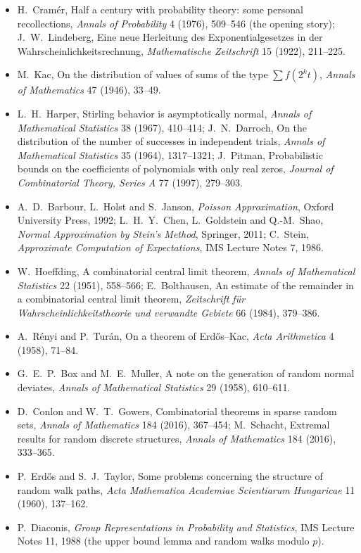 \begin{itemize}
\item H.~Cramér, Half a century with probability theory: some personal recollections, \emph{Annals of Probability} 4 (1976), 509--546 (the opening story);
J.~W.~Lindeberg, Eine neue Herleitung des Exponentialgesetzes in der Wahrscheinlichkeitsrechnung, \emph{Mathematische Zeitschrift} 15 (1922), 211--225.
\item M.~Kac, On the distribution of values of sums of the type $\sum f(2^kt)$, \emph{Annals of Mathematics} 47 (1946), 33--49.
\item L.~H.~Harper, Stirling behavior is asymptotically normal, \emph{Annals of Mathematical Statistics} 38 (1967), 410--414; J.~N.~Darroch, On the distribution of the number of
successes in independent trials, \emph{Annals of Mathematical Statistics} 35 (1964), 1317--1321; J.~Pitman, Probabilistic bounds on the coefficients of polynomials with only real
zeros, \emph{Journal of Combinatorial Theory, Series A} 77 (1997), 279--303.
\item A.~D.~Barbour, L.~Holst and S.~Janson, \emph{Poisson Approximation}, Oxford University Press, 1992; L.~H.~Y.~Chen, L.~Goldstein and Q.-M.~Shao, \emph{Normal Approximation by
Stein's Method}, Springer, 2011; C.~Stein, \emph{Approximate Computation of Expectations}, IMS Lecture Notes 7, 1986.
\item W.~Hoeffding, A combinatorial central limit theorem, \emph{Annals of Mathematical Statistics} 22 (1951), 558--566; E.~Bolthausen, An estimate of the remainder in a combinatorial
central limit theorem, \emph{Zeitschrift für Wahrscheinlichkeitstheorie und verwandte Gebiete} 66 (1984), 379--386.
\item A.~Rényi and P.~Turán, On a theorem of Erdős--Kac, \emph{Acta Arithmetica} 4 (1958), 71--84.
\item G.~E.~P.~Box and M.~E.~Muller, A note on the generation of random normal deviates, \emph{Annals of Mathematical Statistics} 29 (1958), 610--611.
\item D.~Conlon and W.~T.~Gowers, Combinatorial theorems in sparse random sets, \emph{Annals of Mathematics} 184 (2016), 367--454; M.~Schacht, Extremal results for random discrete
structures, \emph{Annals of Mathematics} 184 (2016), 333--365.
\item P.~Erdős and S.~J.~Taylor, Some problems concerning the structure of random walk paths, \emph{Acta Mathematica Academiae Scientiarum Hungaricae} 11 (1960), 137--162.
\item P.~Diaconis, \emph{Group Representations in Probability and Statistics}, IMS Lecture Notes 11, 1988 (the upper bound lemma and random walks modulo $p$).

\end{itemize}
